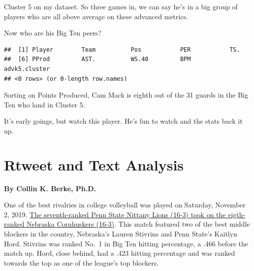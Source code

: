 \documentclass[]{book}
\newenvironment{Shaded}{\begin{snugshade}}{\end{snugshade}}
\newcommand{\DecValTok}[1]{\textcolor[rgb]{0.00,0.00,0.81}{#1}}
\newcommand{\KeywordTok}[1]{\textcolor[rgb]{0.13,0.29,0.53}{\textbf{#1}}}
\newcommand{\NormalTok}[1]{#1}
\newcommand{\OperatorTok}[1]{\textcolor[rgb]{0.81,0.36,0.00}{\textbf{#1}}}
\newcommand{\StringTok}[1]{\textcolor[rgb]{0.31,0.60,0.02}{#1}}
\begin{document}
Cluster 5 on my dataset. So three games in, we can say he's in a big group of players who are all above average on these advanced metrics.

Now who are his Big Ten peers?

\begin{Shaded}
\end{Shaded}

\begin{verbatim}
##  [1] Player        Team          Pos           PER           TS.          
##  [6] PProd         AST.          WS.40         BPM           advk5.cluster
## <0 rows> (or 0-length row.names)
\end{verbatim}

Sorting on Points Produced, Cam Mack is eighth out of the 31 guards in the Big Ten who land in Cluster 5.

It's early goings, but watch this player. He's fun to watch and the stats back it up.

\hypertarget{rtweet-and-text-analysis}{%
\chapter{Rtweet and Text Analysis}\label{rtweet-and-text-analysis}}

\textbf{By Collin K. Berke, Ph.D.}

One of the best rivalries in college volleyball was played on Saturday, November 2, 2019. \href{https://journalstar.com/sports/huskers/volleyball/john-cook-on-the-radio-nebraska-penn-state-match-will/article_c1d5c426-e136-5ef2-b589-510a0f17da82.html}{The seventh-ranked Penn State Nittany Lions (16-3) took on the eigth-ranked Nebraska Cornhuskers (16-3)}. This match featured two of the best middle blockers in the country, Nebraska's Lauren Stivrins and Penn State's Kaitlyn Hord. Stivrins was ranked No.~1 in Big Ten hitting percentage, a .466 before the match up. Hord, close behind, had a .423 hitting percentage and was ranked towards the top as one of the league's top blockers.
\end{document}
